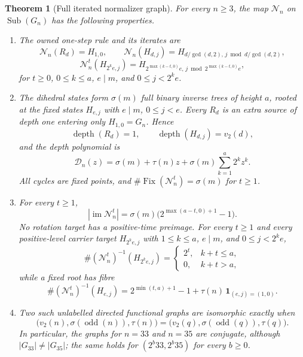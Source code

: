 \documentclass[10pt,a4paper]{amsart}
\newtheorem{theorem}{Theorem}
\theoremstyle{remark}
\newcommand{\Sub}{\operatorname{Sub}}
\newcommand{\im}{\operatorname{im}}
\newcommand{\Fix}{\operatorname{Fix}}
\newcommand{\depth}{\operatorname{depth}}
\begin{document}
\begin{theorem}[Full iterated normalizer graph]\label{thm:main}
For every \(n\geq3\), the map \(\mathcal N_n\) on \(\Sub(G_n)\) has the
following properties.
\begin{enumerate}[label=\textup{(\roman*)},leftmargin=*,itemsep=2pt]
\item The owned one-step rule and its iterates are
\[
\mathcal N_n(R_d)=H_{1,0},\qquad
\mathcal N_n(H_{d,j})
=H_{d/\gcd(d,2),\,j\bmod d/\gcd(d,2)},                 \tag{2}\label{eq:onestep}
\]
\[
\mathcal N_n^t(H_{2^k e,j})
=H_{2^{\max(k-t,0)}e,\,
     j\bmod 2^{\max(k-t,0)}e},                         \tag{3}\label{eq:iterate}
\]
for \(t\geq0\), \(0\leq k\leq a\), \(e\mid m\), and
\(0\leq j<2^ke\).
\item The dihedral states form \(\sigma(m)\) full binary inverse trees of
height \(a\), rooted at the fixed states \(H_{e,j}\) with
\(e\mid m\), \(0\leq j<e\).  Every \(R_d\) is an extra source of depth one
entering only \(H_{1,0}=G_n\).  Hence
\[
\depth(R_d)=1,\qquad \depth(H_{d,j})=v_2(d),
\]
and the depth polynomial is
\[
\mathcal D_n(z)=\sigma(m)+\tau(n)z+
\sigma(m)\sum_{k=1}^{a}2^kz^k.                         \tag{4}\label{eq:depth}
\]
All cycles are fixed points, and
\(\#\Fix(\mathcal N_n^t)=\sigma(m)\) for \(t\geq1\).
\item For every \(t\geq1\),
\[
|\im\mathcal N_n^t|
=\sigma(m)\bigl(2^{\max(a-t,0)+1}-1\bigr).             \tag{5}\label{eq:image}
\]
No rotation target has a positive-time preimage.  For every \(t\geq1\) and
every positive-level carrier target \(H_{2^ke,j}\) with
\(1\leq k\leq a\), \(e\mid m\), and \(0\leq j<2^ke\),
\[
\#(\mathcal N_n^t)^{-1}(H_{2^ke,j})
=
\begin{cases}
2^t,&k+t\leq a,\\
0,&k+t>a,
\end{cases}                                            \tag{6}\label{eq:fibrelevel}
\]
while a fixed root has fibre
\[
\#(\mathcal N_n^t)^{-1}(H_{e,j})
=2^{\min(t,a)+1}-1+\tau(n)\,\mathbf1_{(e,j)=(1,0)}.    \tag{7}\label{eq:fibreroot}
\]
\item Two such unlabelled directed functional graphs are isomorphic exactly
when
\[
\bigl(v_2(n),\sigma(\operatorname{odd}(n)),\tau(n)\bigr)
=\bigl(v_2(q),\sigma(\operatorname{odd}(q)),\tau(q)\bigr). \tag{8}\label{eq:signature}
\]
In particular, the graphs for \(n=33\) and \(n=35\) are conjugate, although
\(|G_{33}|\neq|G_{35}|\); the same holds for
\((2^b33,2^b35)\) for every \(b\geq0\).
\end{enumerate}
\end{theorem}
\end{document}
